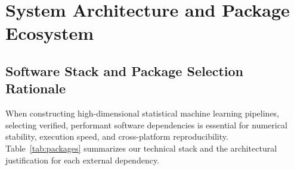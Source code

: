 \documentclass[10pt,a4paper]{article}
\begin{document}
\section{System Architecture and Package Ecosystem}

\subsection{Software Stack and Package Selection Rationale}
When constructing high-dimensional statistical machine learning pipelines, selecting verified, performant software dependencies is essential for numerical stability, execution speed, and cross-platform reproducibility. Table~\ref{tab:packages} summarizes our technical stack and the architectural justification for each external dependency.
\end{document}

